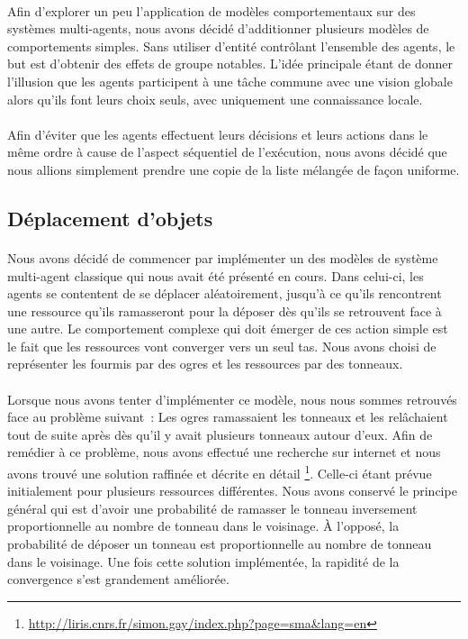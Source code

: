 \paragraph{}
Afin d'explorer un peu l'application de modèles comportementaux sur des
systèmes multi-agents, nous avons décidé d'additionner plusieurs modèles
de comportements simples. Sans utiliser d'entité contrôlant l'ensemble des
agents, le but est d'obtenir des effets de groupe notables. L'idée principale
étant de donner l'illusion que les agents participent à une tâche commune
avec une vision globale alors qu'ils font leurs choix seuls, avec uniquement
une connaissance locale.

\paragraph{}
Afin d'éviter que les agents effectuent leurs décisions et leurs actions dans
le même ordre à cause de l'aspect séquentiel de l'exécution, nous avons décidé
que nous allions simplement prendre une copie de la liste mélangée de façon
uniforme.

\subsection{Déplacement d'objets}
\paragraph{}
Nous avons décidé de commencer par implémenter un des modèles de système
multi-agent classique qui nous avait été présenté en cours. Dans celui-ci, les
agents se contentent de se déplacer aléatoirement, jusqu'à ce qu'ils
rencontrent une ressource qu'ils ramasseront pour la déposer dès qu'ils se
retrouvent face à une autre. Le comportement complexe qui doit émerger de ces
action simple est le fait que les ressources vont converger vers un seul tas.
Nous avons choisi de représenter les fourmis par des ogres et les ressources par
des tonneaux.

\paragraph{}
Lorsque nous avons tenter d'implémenter ce modèle, nous nous sommes retrouvés
face au problème suivant~: Les ogres ramassaient les tonneaux et les
relâchaient tout de suite après dès qu'il y avait plusieurs tonneaux autour
d'eux. Afin de remédier à ce problème, nous avons effectué une recherche sur
internet et nous avons trouvé une solution raffinée et décrite en détail
\footnote{\url{http://liris.cnrs.fr/simon.gay/index.php?page=sma&lang=en}}.
Celle-ci étant prévue initialement pour plusieurs ressources différentes. Nous
avons conservé le principe général qui est d'avoir une probabilité de ramasser
le tonneau inversement proportionnelle au nombre de tonneau dans le voisinage. À
l'opposé, la probabilité de déposer un tonneau est proportionnelle au nombre
de tonneau dans le voisinage. Une fois cette solution implémentée, la rapidité
de la convergence s'est grandement améliorée.


